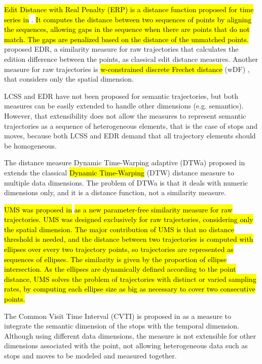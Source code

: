 \documentclass[12pt]{article}
\begin{document}
\hl{Edit Distance with Real Penalty (ERP) is a distance function proposed for time series in }\cite{Chen:2004:MLE:1316689.1316758}.\hl{ It  computes the distance between two sequences of points by aligning the sequences, allowing gaps in the sequence when there are points that do not match. The gaps are penalized based on the distance of the unmatched points.}
\cite{Chen:2005:RFS:1066157.1066213} proposed EDR, a similarity measure for raw trajectories that calculates the edition difference between the points, as classical edit distance measures. Another measure for raw trajectories is \hl{w-constrained discrete Frechet distance} (wDF) \citep{Ding:2008:ESJ:1440463.1440989}, that considers only the spatial dimension.

LCSS and EDR have not been proposed for semantic trajectories, but both measures can be easily extended to handle other dimensions (e.g. semantics). However, that extensibility does not allow the measures to represent semantic trajectories as a sequence of heterogeneous elements, that is the case of stops and moves, because both LCSS and EDR demand that all trajectory elements should be homogeneous.

The distance measure Dynamic Time-Warping adaptive (DTWa) proposed in \cite{Shokoohi-Yekta2017} extends the classical \hl{Dynamic Time-Warping} (DTW) \citep{berndt1994using} distance measure to multiple data dimensions. The problem of DTWa is that it deals with numeric dimensions only, and it is a distance function, not a similarity measure.

\hl{UMS was proposed in }\cite{Furtado-UMS-2018}\hl{ as a new parameter-free similarity measure for raw trajectories. UMS was designed exclusively for raw trajectories, considering only the spatial dimension. The major contribution of UMS is that no distance threshold is needed, and the distance between two trajectories is computed with ellipses over every two trajectory points, so trajectories are represented as sequences of ellipses. The similarity is given by the proportion of ellipse intersection. As the ellipses are dynamically defined according to the point distance, UMS solves the problem of trajectories with distinct or varied sampling rates, by computing each ellipse size as big as necessary to cover two consecutive points.}


The Common Visit Time Interval (CVTI) is proposed in \cite{Kang:2009:SMT:1529282.1529580} as a measure to integrate the semantic dimension of the stops with the temporal dimension. Although using different data dimensions, the measure is not extensible for other dimensions associated with the point, not allowing heterogeneous data such as stops and moves to be modeled and measured together.
\end{document}
